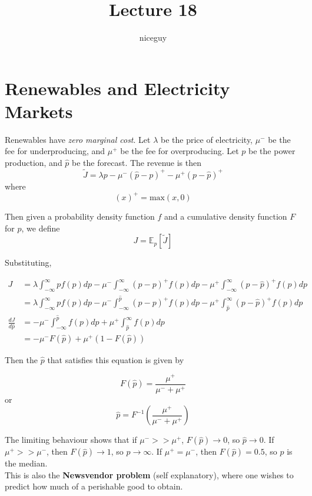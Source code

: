 \documentclass[12pt]{article}
\author{niceguy}
\title{Lecture 18}
\begin{document}
\maketitle

\section{Renewables and Electricity Markets}

Renewables have \textit{zero marginal cost}. Let $\lambda$ be the price of electricity, $\mu^-$ be the fee for underproducing, and $\mu^+$ be the fee for overproducing. Let $p$ be the power production, and $\hat p$ be the forecast. The revenue is then
$$\tilde J = \lambda p - \mu^-(\hat p - p)^+ - \mu^+(p - \hat p)^+$$
where
$$(x)^+ = \text{max}(x,0)$$

Then given a probability density function $f$ and a cumulative density function $F$ for $p$, we define
$$J = \mathbb{E}_p[\tilde J]$$
 
Substituting,

\begin{align*}
	J &= \lambda \int_{-\infty}^\infty pf(p)dp - \mu^-\int_{-\infty}^\infty (\hat p - p)^+f(p)dp - \mu^+\int_{-\infty}^\infty (p - \hat p)^+f(p)dp \\
	  &= \lambda \int_{-\infty}^\infty pf(p)dp - \mu^-\int_{-\infty}^{\hat p} (\hat p - p)^+f(p)dp - \mu^+\int_{\hat p}^\infty (p - \hat p)^+f(p)dp \\
	\frac{dJ}{d\hat p} &= -\mu^-\int_{-\infty}^{\hat p} f(p)dp + \mu^+\int_{\hat p}^\infty f(p)dp \\
			   &= -\mu^-F(\hat p) + \mu^+(1-F(\hat p))
\end{align*}

Then the $\hat p$ that satisfies this equation is given by

$$F(\hat p) = \frac{\mu^+}{\mu^- + \mu^+}$$
or
$$\hat p = F^{-1}\left(\frac{\mu^+}{\mu^- + \mu^+}\right)$$

The limiting behaviour shows that if $\mu^- >> \mu^+$, $F(\hat p) \rightarrow 0$, so $\hat p \rightarrow 0$. If $\mu^+ >> \mu^-$, then $F(\hat p) \rightarrow 1$, so $\hat p \rightarrow \infty$. If $\mu^+ = \mu^-$, then $F(\hat p) = 0.5$, so $\hat p$ is the median. \\

This is also the \textbf{Newsvendor problem} (self explanatory), where one wishes to predict how much of a perishable good to obtain.
\end{document}

